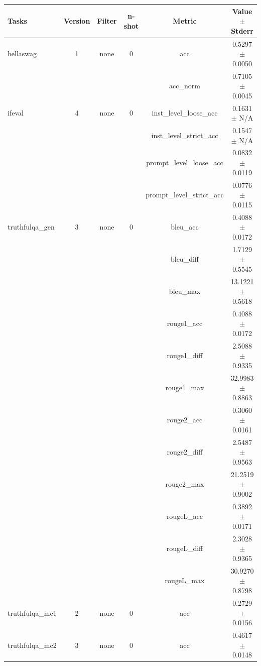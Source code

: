 \documentclass{ifacconf}
\begin{document}
\begin{strip}
\begin{minipage}{\textwidth}
			\begin{table}[H]
				\centering
				\begin{tabular}{|l|c|c|c|c|c|}
					\hline
					\textbf{Tasks} & \textbf{Version} & \textbf{Filter} & \textbf{n-shot} & \textbf{Metric} & \textbf{Value} $\pm$ \textbf{Stderr} \\ \hline
					hellaswag & 1 & none & 0 & acc & 0.5297 $\pm$ 0.0050 \\ \hline
					& & & & acc\_norm & 0.7105 $\pm$ 0.0045 \\ \hline
					ifeval & 4 & none & 0 & inst\_level\_loose\_acc & 0.1631 $\pm$ N/A \\ \hline
					& & & & inst\_level\_strict\_acc & 0.1547 $\pm$ N/A \\ \hline
					& & & & prompt\_level\_loose\_acc & 0.0832 $\pm$ 0.0119 \\ \hline
					& & & & prompt\_level\_strict\_acc & 0.0776 $\pm$ 0.0115 \\ \hline
					truthfulqa\_gen & 3 & none & 0 & bleu\_acc & 0.4088 $\pm$ 0.0172 \\ \hline
					& & & & bleu\_diff & 1.7129 $\pm$ 0.5545 \\ \hline
					& & & & bleu\_max & 13.1221 $\pm$ 0.5618 \\ \hline
					& & & & rouge1\_acc & 0.4088 $\pm$ 0.0172 \\ \hline
					& & & & rouge1\_diff & 2.5088 $\pm$ 0.9335 \\ \hline
					& & & & rouge1\_max & 32.9983 $\pm$ 0.8863 \\ \hline
					& & & & rouge2\_acc & 0.3060 $\pm$ 0.0161 \\ \hline
					& & & & rouge2\_diff & 2.5487 $\pm$ 0.9563 \\ \hline
					& & & & rouge2\_max & 21.2519 $\pm$ 0.9002 \\ \hline
					& & & & rougeL\_acc & 0.3892 $\pm$ 0.0171 \\ \hline
					& & & & rougeL\_diff & 2.3028 $\pm$ 0.9365 \\ \hline
					& & & & rougeL\_max & 30.9270 $\pm$ 0.8798 \\ \hline
					truthfulqa\_mc1 & 2 & none & 0 & acc & 0.2729 $\pm$ 0.0156 \\ \hline
					truthfulqa\_mc2 & 3 & none & 0 & acc & 0.4617 $\pm$ 0.0148 \\ \hline
				\end{tabular}
				\label{tab:llama31_q8}
			\end{table}
			

\end{minipage}
\end{strip}
\end{document}
